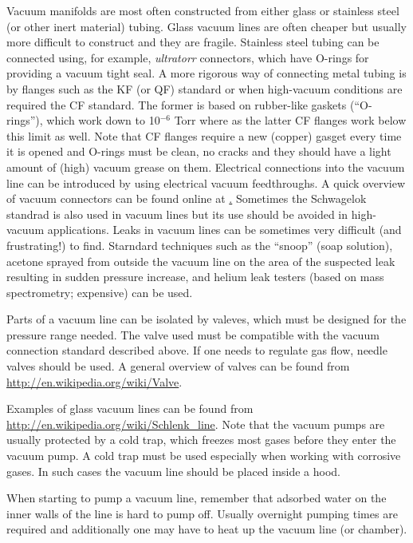 \documentclass[byrevtex,amssymb,aps,pra,floatfix,letterpaper]{revtex4}
\begin{document}
Vacuum manifolds are most often constructed from either glass or stainless steel (or other inert material) tubing. Glass vacuum lines are often cheaper but usually more difficult to construct and they are fragile. Stainless steel tubing can be connected using, for example, \textit{ultratorr} connectors, which have O-rings for providing a vacuum tight seal. A more rigorous way of connecting metal tubing is by flanges such as the KF (or QF) standard or when high-vacuum conditions are required the CF standard. The former is based on rubber-like gaskets (``O-rings''), which work down to 10$^{-6}$ Torr where as the latter CF flanges work below this limit as well. Note that CF flanges require a new (copper) gasget every time it is opened and O-rings must be clean, no cracks and they should have a light amount of (high) vacuum grease on them. Electrical connections into the vacuum line can be introduced by using electrical vacuum feedthroughs. A quick overview of vacuum connectors can be found online at \href{http://en.wikipedia.org/wiki/Vacuum_flange}. Sometimes the Schwagelok standrad is also used in vacuum lines but its use should be avoided in high-vacuum applications. Leaks in vacuum lines can be sometimes very difficult (and frustrating!) to find. Starndard techniques such as the ``snoop'' (soap solution), acetone sprayed from outside the vacuum line on the area of the suspected leak resulting in sudden pressure increase, and helium leak testers (based on mass spectrometry; expensive) can be used.

Parts of a vacuum line can be isolated by valeves, which must be designed for the pressure range needed. The valve used must be compatible with the vacuum connection standard described above. If one needs to regulate gas flow, needle valves should be used. A general overview of valves can be found from \url{http://en.wikipedia.org/wiki/Valve}.

Examples of glass vacuum lines can be found from \url{http://en.wikipedia.org/wiki/Schlenk_line}. Note that the vacuum pumps are usually protected by a cold trap, which freezes most gases before they enter the vacuum pump. A cold trap must be used especially when working with corrosive gases. In such cases the vacuum line should be placed inside a hood.

When starting to pump a vacuum line, remember that adsorbed water on the inner walls of the line is hard to pump off. Usually overnight pumping times are required and additionally one may have to heat up the vacuum line (or chamber).
\end{document}
